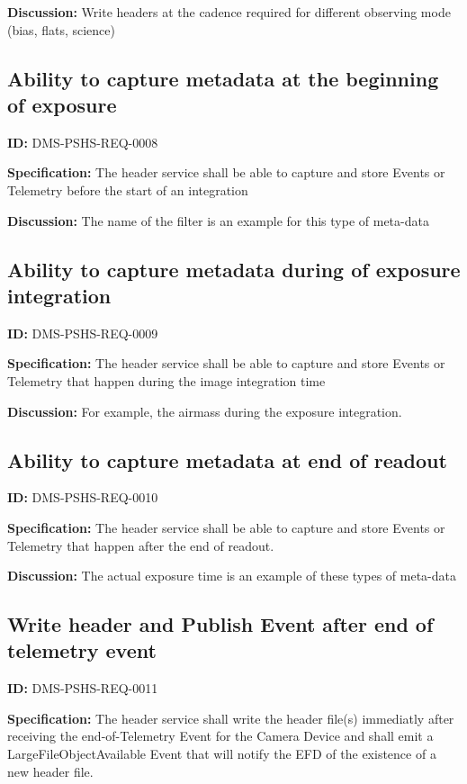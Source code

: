 \documentclass[SE,toc,lsstdraft]{lsstdoc}
\begin{document}
\textbf{Discussion:}
Write headers at the cadence required for different observing mode (bias, flats, science)

\subsection{Ability to capture metadata at the beginning of exposure}

\label{DMS-PSHS-REQ-0008}
\textbf{ID:} DMS-PSHS-REQ-0008

\textbf{Specification:}
The header service shall be able to capture and store Events or Telemetry before the start of an integration

\textbf{Discussion:}
The name of the filter is an example for this type of meta-data

\subsection{Ability to capture metadata during of exposure integration}

\label{DMS-PSHS-REQ-0009}
\textbf{ID:} DMS-PSHS-REQ-0009

\textbf{Specification:}
The header service shall be able to capture and store Events or Telemetry that happen during the image integration time

\textbf{Discussion:}
For example, the airmass during the exposure integration.

\subsection{Ability to capture metadata at end of readout}

\label{DMS-PSHS-REQ-0010}
\textbf{ID:} DMS-PSHS-REQ-0010

\textbf{Specification:}
The header service shall be able to capture and store Events or Telemetry that happen after the end of readout.

\textbf{Discussion:}
The actual exposure time is an example of these types of meta-data

\subsection{Write header and Publish Event after end of telemetry event}

\label{DMS-PSHS-REQ-0011}
\textbf{ID:} DMS-PSHS-REQ-0011

\textbf{Specification:}
The header service shall write the header file(s) immediatly after receiving the end-of-Telemetry Event for the Camera Device and shall emit a LargeFileObjectAvailable Event that will notify the EFD of the existence of a new header file.
\end{document}
